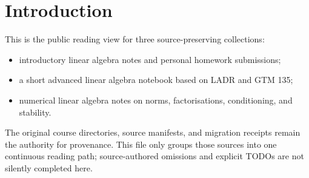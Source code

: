 \chapter{Introduction}

This is the public reading view for three source-preserving collections:

\begin{itemize}
\tightlist
\item
  introductory linear algebra notes and personal homework submissions;
\item
  a short advanced linear algebra notebook based on LADR and GTM 135;
\item
  numerical linear algebra notes on norms, factorisations, conditioning, and stability.
\end{itemize}

The original course directories, source manifests, and migration receipts remain the authority for provenance. This file only groups those sources into one continuous reading path; source-authored omissions and explicit TODOs are not silently completed here.
